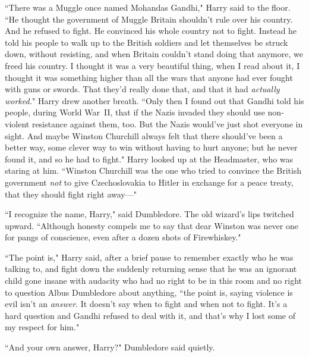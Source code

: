 ``There was a Muggle once named Mohandas Gandhi," Harry said to the floor. ``He thought the government of Muggle Britain shouldn't rule over his country. And he refused to fight. He convinced his whole country not to fight. Instead he told his people to walk up to the British soldiers and let themselves be struck down, without resisting, and when Britain couldn't stand doing that anymore, we freed his country. I thought it was a very beautiful thing, when I read about it, I thought it was something higher than all the wars that anyone had ever fought with guns or swords. That they'd really done that, and that it had \emph{actually worked.}" Harry drew another breath. ``Only then I found out that Gandhi told his people, during World War~II, that if the Nazis invaded they should use non-violent resistance against them, too. But the Nazis would've just shot everyone in sight. And maybe Winston Churchill always felt that there should've been a better way, some clever way to win without having to hurt anyone; but he never found it, and so he had to fight." Harry looked up at the Headmaster, who was staring at him. ``Winston Churchill was the one who tried to convince the British government \emph{not} to give Czechoslovakia to Hitler in exchange for a peace treaty, that they should fight right away---"

``I recognize the name, Harry," said Dumbledore. The old wizard's lips twitched upward. ``Although honesty compels me to say that dear Winston was never one for pangs of conscience, even after a dozen shots of Firewhiskey."

``The point is," Harry said, after a brief pause to remember exactly who he was talking to, and fight down the suddenly returning sense that he was an ignorant child gone insane with audacity who had no right to be in this room and no right to question Albus Dumbledore about anything, ``the point is, saying violence is evil isn't an \emph{answer}. It doesn't say when to fight and when not to fight. It's a hard question and Gandhi refused to deal with it, and that's why I lost some of my respect for him."

``And your own answer, Harry?" Dumbledore said quietly.

